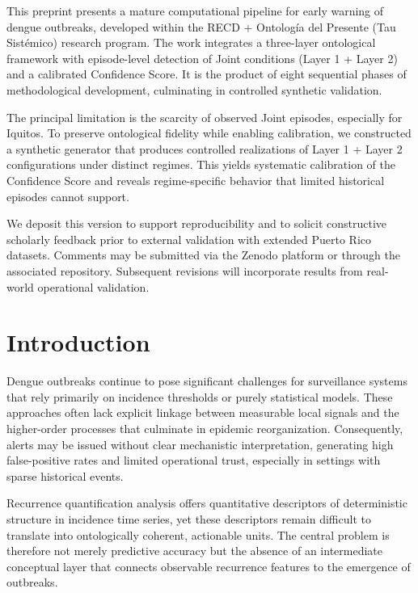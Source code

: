 \documentclass[11pt,a4paper]{article}
\begin{document}
\begin{zenodolletter}
This preprint presents a mature computational pipeline for early warning of dengue outbreaks, developed within the RECD + Ontología del Presente (Tau Sistémico) research program. The work integrates a three-layer ontological framework with episode-level detection of Joint conditions (Layer 1 + Layer 2) and a calibrated Confidence Score. It is the product of eight sequential phases of methodological development, culminating in controlled synthetic validation.

The principal limitation is the scarcity of observed Joint episodes, especially for Iquitos. To preserve ontological fidelity while enabling calibration, we constructed a synthetic generator that produces controlled realizations of Layer 1 + Layer 2 configurations under distinct regimes. This yields systematic calibration of the Confidence Score and reveals regime-specific behavior that limited historical episodes cannot support.

We deposit this version to support reproducibility and to solicit constructive scholarly feedback prior to external validation with extended Puerto Rico datasets. Comments may be submitted via the Zenodo platform or through the associated repository. Subsequent revisions will incorporate results from real-world operational validation.
\end{zenodolletter}

\vspace{0.5em}

\section{Introduction}

Dengue outbreaks continue to pose significant challenges for surveillance systems that rely primarily on incidence thresholds or purely statistical models. These approaches often lack explicit linkage between measurable local signals and the higher-order processes that culminate in epidemic reorganization. Consequently, alerts may be issued without clear mechanistic interpretation, generating high false-positive rates and limited operational trust, especially in settings with sparse historical events.

Recurrence quantification analysis offers quantitative descriptors of deterministic structure in incidence time series, yet these descriptors remain difficult to translate into ontologically coherent, actionable units. The central problem is therefore not merely predictive accuracy but the absence of an intermediate conceptual layer that connects observable recurrence features to the emergence of outbreaks.
\end{document}
